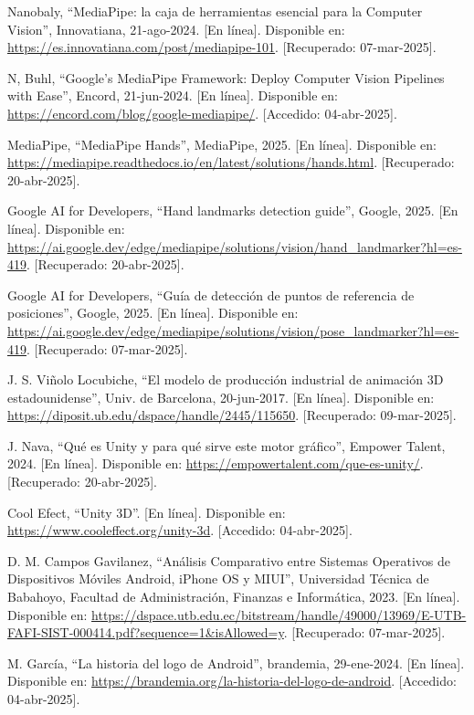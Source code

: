 \begin{thebibliography}{200}
    Nanobaly, “MediaPipe: la caja de herramientas esencial para la Computer Vision”, Innovatiana, 21-ago-2024. [En línea]. Disponible en: \url{https://es.innovatiana.com/post/mediapipe-101}. [Recuperado: 07-mar-2025].

    N, Buhl, “Google’s MediaPipe Framework: Deploy Computer Vision Pipelines with Ease”, Encord, 21-jun-2024. [En línea]. Disponible en: \url{https://encord.com/blog/google-mediapipe/}. [Accedido: 04-abr-2025].

    MediaPipe, “MediaPipe Hands”, MediaPipe, 2025. [En línea]. Disponible en: \url{https://mediapipe.readthedocs.io/en/latest/solutions/hands.html}. [Recuperado: 20-abr-2025].

    Google AI for Developers, “Hand landmarks detection guide”, Google, 2025. [En línea]. Disponible en: \url{https://ai.google.dev/edge/mediapipe/solutions/vision/hand_landmarker?hl=es-419}. [Recuperado: 20-abr-2025].

    Google AI for Developers, “Guía de detección de puntos de referencia de posiciones”, Google, 2025. [En línea]. Disponible en: \url{https://ai.google.dev/edge/mediapipe/solutions/vision/pose_landmarker?hl=es-419}. [Recuperado: 07-mar-2025].

    J. S. Viñolo Locubiche, “El modelo de producción industrial de animación 3D estadounidense”, Univ. de Barcelona, 20-jun-2017. [En línea]. Disponible en: \url{https://diposit.ub.edu/dspace/handle/2445/115650}. [Recuperado: 09-mar-2025].

    J. Nava, “Qué es Unity y para qué sirve este motor gráfico”, Empower Talent, 2024. [En línea]. Disponible en: \url{https://empowertalent.com/que-es-unity/}. [Recuperado: 20-abr-2025].

    Cool Efect, “Unity 3D”. [En línea]. Disponible en: \url{https://www.cooleffect.org/unity-3d}. [Accedido: 04-abr-2025].

    D. M. Campos Gavilanez, “Análisis Comparativo entre Sistemas Operativos de Dispositivos Móviles Android, iPhone OS y MIUI”, Universidad Técnica de Babahoyo, Facultad de Administración, Finanzas e Informática, 2023. [En línea]. Disponible en: \url{https://dspace.utb.edu.ec/bitstream/handle/49000/13969/E-UTB-FAFI-SIST-000414.pdf?sequence=1&isAllowed=y}. [Recuperado: 07-mar-2025].

    M. García, “La historia del logo de Android”, brandemia, 29-ene-2024. [En línea]. Disponible en: \url{https://brandemia.org/la-historia-del-logo-de-android}. [Accedido: 04-abr-2025].


\end{thebibliography}
